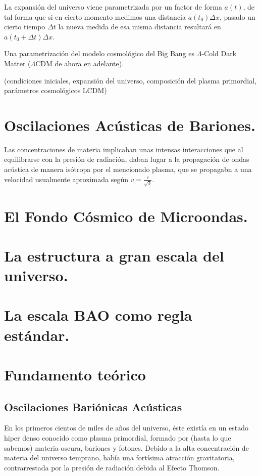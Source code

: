 La expansión del universo viene parametrizada por un factor de forma $a(t)$, de tal forma que si en cierto momento medimos una distancia $a(t_0)\Delta x$, pasado un cierto tiempo $\Delta t$ la nueva medida de esa misma distancia resultará en $a(t_0+\Delta t) \Delta x$. 

Una parametrización del modelo cosmológico del Big Bang es $\Lambda$-Cold Dark Matter ($\Lambda$CDM de ahora en adelante). 


(condiciones iniciales, expansión del universo, composición del plasma primordial, parámetros cosmológicos LCDM)

\section{Oscilaciones Acústicas de Bariones.}
Las concentraciones de materia implicaban unas intensas interacciones que al equilibrarse con la presión de radiación, daban lugar a la propagación de ondas acústica de manera isótropa por el mencionado plasma, que se propagabn a una velocidad usualmente aproximada según $v = \frac{c}{\sqrt{3} }$. 

\section{El Fondo Cósmico de Microondas.}

\section{La estructura a gran escala del universo.}

\section{La escala BAO como regla estándar.}






\section{Fundamento teórico}
\subsection{Oscilaciones Bariónicas Acústicas}
En los primeros cientos de miles de años del universo, éste existía en un estado hiper denso conocido como plasma primordial, formado por (hasta lo que sabemos) materia oscura, bariones y fotones.
Debido a la alta concentración de materia del universo temprano, había una fortísima atracción gravitatoria, contrarrestada por la presión de radiación debida al Efecto Thomson. 

